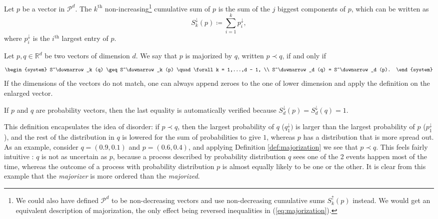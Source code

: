 \begin{definition}[Cumulative sum] %
    Let $p$ be a vector in $\mathcal{P}^d$. The $k^{\text{th}}$ non-increasing\footnote{We could also have defined $\mathcal{P}^d$ to be non-decreasing vectors and use non-decreasing cumulative sums $S^\uparrow_k (p)$ instead. We would get an equivalent description of majorization, the only effect being reversed inequalities in (\ref{eq:majorization}).} cumulative sum of $p$ is the sum of the $j$ biggest components of $p$, which can be written as
    \begin{equation}
        S^\downarrow_k (p) \coloneqq \sum_{i = 1}^{k} p^\downarrow_i,
    \end{equation}
    where $p^\downarrow_i$ is the $i^{\text{th}}$ largest entry of $p$. 
\end{definition}

\begin{definition} \label{def:majorization}
    Let $p, q \in \mathbb{R}^d$ be two vectors of dimension $d$. We say that $p$ is majorized by $q$, written $p \prec q$, if and only if
    \begin{equation} \label{eq:majorization}
        \begin{system}
            S^\downarrow_k (q) \geq S^\downarrow_k (p) \quad \forall k = 1,...,d - 1, \\
            S^\downarrow_d (q) = S^\downarrow_d (p).
        \end{system}
    \end{equation}
If the dimensions of the vectors do not match, one can always append zeroes to the one of lower dimension and apply the definition on the enlarged vector.
\end{definition}

\begin{remark}
    If $p$ and $q$ are probability vectors, then the last equality is automatically verified because $S^\downarrow_d (p) = S^\downarrow_d (q) = 1$.
\end{remark}

This definition encapsulates the idea of disorder: if $p \prec q$, then the largest probability of $q$ ($q_1^\downarrow)$ is larger than the largest probability of $p$ ($p_1^\downarrow$), and the rest of the distribution in $q$ is lowered for the sum of probabilities to give $1$, whereas $p$ has a distribution that is more spread out. As an example, consider $q = (0.9, 0.1)$ and $p = (0.6, 0.4)$, and applying Definition \ref{def:majorization} we see that $p \prec q$. This feels fairly intuitive : $q$ is not as uncertain as $p$, because a process described by probability distribution $q$ sees one of the 2 events happen most of the time, whereas the outcome of a process with probability distribution $p$ is almost equally likely to be one or the other. It is clear from this example that the \textit{majorizer} is more ordered than the \textit{majorized}.

